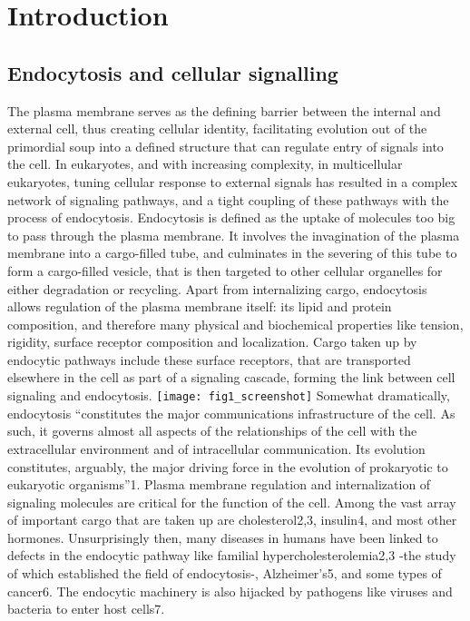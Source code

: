 \chapter{Introduction} %
\graphicspath{ {Desktop/figures/} }
\label{Ch:Aims} %

\section{Endocytosis and cellular signalling}
The plasma membrane serves as the defining barrier between the internal and external cell, thus creating cellular identity, facilitating evolution out of the primordial soup into a defined structure that can regulate entry of signals into the cell. In eukaryotes, and with increasing complexity, in multicellular eukaryotes, tuning cellular response to external signals has resulted in a complex network of signaling pathways, and a tight coupling of these pathways with the process of endocytosis. Endocytosis is defined as the uptake of molecules too big to pass through the plasma membrane. It involves the invagination of the plasma membrane into a cargo-filled tube, and culminates in the severing of this tube to form a cargo-filled vesicle, that is then targeted to other cellular organelles for either degradation or recycling. Apart from internalizing cargo, endocytosis allows regulation of the plasma membrane itself: its lipid and protein composition, and therefore many physical and biochemical properties like tension, rigidity, surface receptor composition and localization. Cargo taken up by endocytic pathways include these surface receptors, that are transported elsewhere in the cell as part of a signaling cascade, forming the link between cell signaling and endocytosis.
\texttt{[image: fig1\_screenshot]}
\vspace{5mm}
Somewhat dramatically, endocytosis “constitutes the major communications infrastructure of the cell. As such, it governs almost all aspects of the relationships of the cell with the extracellular environment and of intracellular communication. Its evolution constitutes, arguably, the major driving force in the evolution of prokaryotic to eukaryotic organisms”1.  Plasma membrane regulation and internalization of signaling molecules are critical for the function of the cell. Among the vast array of important cargo that are taken up are cholesterol2,3, insulin4, and most other hormones. Unsurprisingly then, many diseases in humans have been linked to defects in the endocytic pathway like familial hypercholesterolemia2,3 -the study of which established the field of endocytosis-, Alzheimer’s5, and some types of cancer6. The endocytic machinery is also hijacked by pathogens like viruses and bacteria to enter host cells7. 

